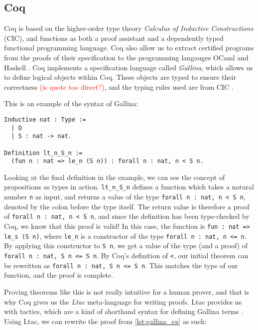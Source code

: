 \subsection{Coq}
\label{ssec:coq}

Coq is based on the higher-order type theory \textit{Calculus of Inductive Constructions} (CIC), and
functions as both a proof assistant and a dependently typed functional programming language.
Coq also allow us to extract certified programs from the proofs of their specification to
the programming langauges OCaml and Haskell \cite{cintro}.
Coq implements a specification language called \textit{Gallina},
which allows us to define logical objects within Coq.
These objects are typed to ensure their correctness \textcolor{red}{(is quote too direct?)},
and the typing rules used are from CIC \cite{cic}.

This is an example of the syntax of Gallina:

\begin{minipage}{\linewidth}
\begin{lstlisting}[language=Coq, label={lst:gallina_ex}, caption={Example of Gallina syntax}]
Inductive nat : Type :=
  | O
  | S : nat -> nat.

Definition lt_n_S_n :=
  (fun n : nat => le_n (S n)) : forall n : nat, n < S n.
\end{lstlisting}
\end{minipage}

Looking at the final definition in the example, we can see the
concept of propositions as types in action.
\lstinline{lt_n_S_n} defines a function which takes a natural number \lstinline{n}
as input, and returns a value of the type \lstinline{forall n : nat, n < S n},
denoted by the colon before the type itself.
The return value is therefore a proof of \lstinline{forall n : nat, n < S n}, and since
the definition has been type-checked by Coq, we know that this proof is valid!
In this case, the function is
\lstinline{fun : nat => le_s (S n)}, where \lstinline{le_n} is a constructor
of the type \lstinline{forall n : nat, n <= n}. By applying this constructor
to \lstinline{S n}, we get a value of the type (and a proof) of
\lstinline{forall n : nat, S n <= S n}. By Coq's definition of \lstinline{<},
our initial theorem can be rewritten as \lstinline{forall n : nat, S n <= S n}.
This matches the type of our function, and the proof is complete.

Proving theorems like this is not really intuitive for a human prover,
and that is why Coq gives us the \textit{Ltac} meta-language for writing proofs.
Ltac provides us with tactics, which are a kind of shorthand syntax for defining Gallina terms \cite{cltac}.
Using Ltac, we can rewrite the proof from \ref{lst:gallina_ex} as such:

